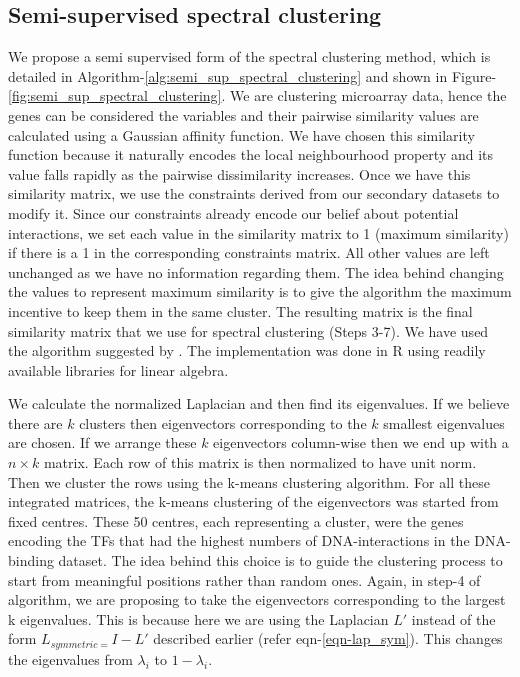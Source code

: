 \subsection{Semi-supervised spectral clustering} \label{sec:sssc}
We propose a semi supervised form of the spectral clustering method, which is detailed in Algorithm-\ref{alg:semi_sup_spectral_clustering} and shown in Figure-\ref{fig:semi_sup_spectral_clustering}. We are clustering microarray data, hence the genes can be considered the variables and their pairwise similarity values are calculated using a Gaussian affinity function. We have chosen this similarity function because it naturally encodes the local neighbourhood property and its value falls rapidly as the pairwise dissimilarity increases. Once we have this similarity matrix, we use the constraints derived from our secondary datasets to modify it. Since our constraints already encode our belief about potential interactions, we set each value in the similarity matrix to 1 (maximum similarity) if there is a 1 in the corresponding constraints matrix. All other values are left unchanged as we have no information regarding them. The idea behind changing the values to represent maximum similarity is to give the algorithm the maximum incentive to keep them in the same cluster. The resulting matrix is the final similarity matrix that we use for spectral clustering (Steps 3-7). We have used the algorithm suggested by \citet{ng2001onspectral}. The implementation was done in R using readily available libraries for linear algebra. 

We calculate the normalized Laplacian and then find its eigenvalues. If we believe there are $k$ clusters then eigenvectors corresponding to the $k$ smallest eigenvalues are chosen. If we arrange these $k$ eigenvectors column-wise then we end up with a $n \times k$ matrix. Each row of this matrix is then normalized to have unit norm. Then we cluster the rows using the k-means clustering algorithm. For all these integrated matrices, the k-means clustering of the eigenvectors was started from fixed centres. These 50 centres, each representing a cluster, were the genes encoding the TFs that had the highest numbers of DNA-interactions in the DNA-binding dataset. The idea behind this choice is to guide the clustering process to start from meaningful positions rather than random ones. Again, in step-4 of algorithm, we are proposing to take the eigenvectors corresponding to the largest k eigenvalues. This is because here we are using the Laplacian $L'$ instead of the form $L_{symmetric=}I-L'$ described earlier (refer eqn-\ref{eqn-lap_sym}). This changes the eigenvalues from $\lambda_{i}$ to $1-\lambda_{i}$. 

